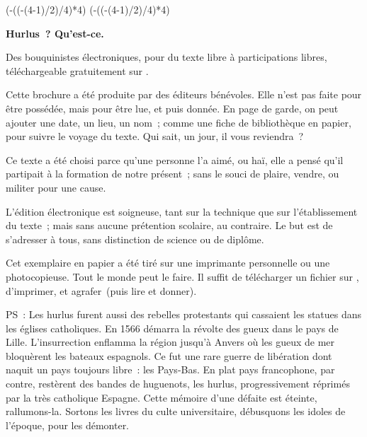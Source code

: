 \documentclass[french,twoside]{book} %
\def\truncdiv#1#2{((#1-(#2-1)/2)/#2)}
\def\moduloop#1#2{(#1-\truncdiv{#1}{#2}*#2)}
\def\modulo#1#2{\number\numexpr\moduloop{#1}{#2}\relax}
\begin{document}
 


\ifbooklet
  \pagestyle{empty}
  \clearpage
  \ifnum\modulo{\value{page}}{4}=0 \hbox{}\newpage\hbox{}\newpage\fi
  \ifnum\modulo{\value{page}}{4}=1 \hbox{}\newpage\hbox{}\newpage\fi


  \hbox{}\newpage
  \ifodd\value{page}\hbox{}\newpage\fi
  {\centering\color{rubric}\bfseries\noindent\large
    Hurlus ? Qu’est-ce.\par
    \bigskip
  }
  \noindent Des bouquinistes électroniques, pour du texte libre à participations libres,
  téléchargeable gratuitement sur \href{https://hurlus.fr}{}.\par
  \bigskip
  \noindent Cette brochure a été produite par des éditeurs bénévoles.
  Elle n’est pas faite pour être possédée, mais pour être lue, et puis donnée.
  En page de garde, on peut ajouter une date, un lieu, un nom ;
  comme une fiche de bibliothèque en papier,
  pour suivre le voyage du texte. Qui sait, un jour, il vous reviendra ?
  \par

  Ce texte a été choisi parce qu’une personne l’a aimé,
  ou haï, elle a pensé qu’il partipait à la formation de notre présent ;
  sans le souci de plaire, vendre, ou militer pour une cause.
  \par

  L’édition électronique est soigneuse, tant sur la technique
  que sur l’établissement du texte ; mais sans aucune prétention scolaire, au contraire.
  Le but est de s’adresser à tous, sans distinction de science ou de diplôme.
  \par

  Cet exemplaire en papier a été tiré sur une imprimante personnelle
   ou une photocopieuse. Tout le monde peut le faire.
  Il suffit de
  télécharger un fichier sur \href{https://hurlus.fr}{},
  d’imprimer, et agrafer (puis lire et donner).\par

  \bigskip

  \noindent PS : Les hurlus furent aussi des rebelles protestants qui cassaient les statues dans les églises catholiques. En 1566 démarra la révolte des gueux dans le pays de Lille. L’insurrection enflamma la région jusqu’à Anvers où les gueux de mer bloquèrent les bateaux espagnols.
  Ce fut une rare guerre de libération dont naquit un pays toujours libre : les Pays-Bas.
  En plat pays francophone, par contre, restèrent des bandes de huguenots, les hurlus, progressivement réprimés par la très catholique Espagne.
  Cette mémoire d’une défaite est éteinte, rallumons-la. Sortons les livres du culte universitaire, débusquons les idoles de l’époque, pour les démonter.
\fi
\end{document}
